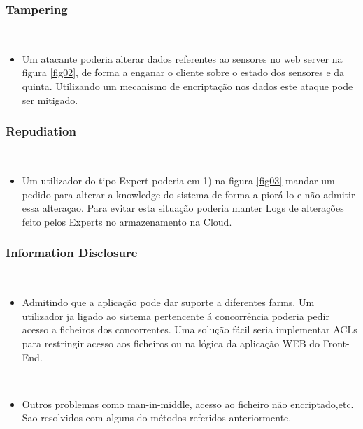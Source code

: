 \subsubsection{Tampering}
\hfill\\
\begin{itemize}

\item Um atacante poderia alterar dados referentes ao sensores no web server na figura \ref{fig02}, de forma a enganar o cliente sobre o estado dos sensores e da quinta. Utilizando um mecanismo de encriptação nos dados este ataque pode ser mitigado.

\end{itemize}

\subsubsection{Repudiation}
\hfill\\
\begin{itemize}

\item Um utilizador do tipo Expert poderia em 1) na figura \ref{fig03} mandar um pedido para alterar a knowledge do sistema de forma a piorá-lo e não admitir essa alteraçao. Para evitar esta situação poderia manter Logs de alterações feito pelos Experts no armazenamento na Cloud.

\end{itemize}

\subsubsection{Information Disclosure}
\hfill\\
\begin{itemize}
\item Admitindo que a aplicação pode dar suporte a diferentes farms. Um utilizador ja ligado ao sistema pertencente á concorrência poderia pedir acesso a ficheiros dos concorrentes. Uma solução fácil seria implementar ACLs para restringir acesso aos ficheiros ou na lógica da aplicação WEB do Front-End.

\hfill\\

\item Outros problemas como man-in-middle, acesso ao ficheiro não encriptado,etc. Sao resolvidos com alguns do métodos referidos anteriormente.
\end{itemize}

